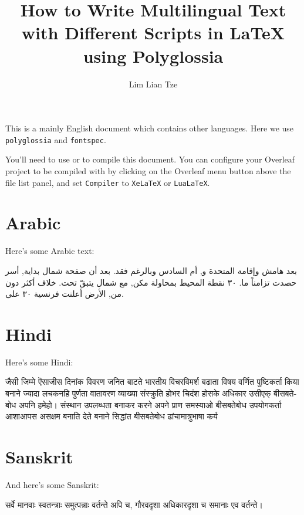 \documentclass[12pt]{scrartcl}
\title{How to Write Multilingual Text with Different Scripts in \LaTeX{} using Polyglossia}
\author{Lim Lian Tze}
\date{}
\begin{document}
\maketitle

This is a mainly English document which contains other languages. Here we use \texttt{polyglossia} and \texttt{fontspec}.

You'll need to use  or  to compile this document. You can configure your Overleaf project to be compiled with  by clicking on the Overleaf menu button above the file list panel, and set \texttt{Compiler} to \texttt{XeLaTeX} or \texttt{LuaLaTeX}.



\section{Arabic}
Here's some Arabic text:

\begin{Arabic}
بعد هامش وإقامة المتحدة و, أم السادس وبالرغم فقد. بعد أن صفحة شمال بداية, أسر حصدت تزامناً ما. ٣٠ نقطة المحيط بمحاولة مكن, مع شمال يتبقّ تحت. خلاف أكثر دون من, الأرض أعلنت فرنسية ٣٠ على.
\end{Arabic}



\section{Hindi}

Here's some Hindi:

\begin{hindi}
जैसी जिम्मे ऎसाजीस दिनांक विवरण जनित बाटते भारतीय विचरविमर्श बढाता विषय वर्णित पुष्टिकर्ता किया बनाने ज्यादा लचकनहि पुर्णता वातावरण व्याख्या संस्क्रुति होभर चिदंश होसके अधिकार उसीएक् बीसबतेबोध अपनि हमेहो। संस्थान उपलब्धता बनाकर करने अपने प्राण समस्याओ बीसबतेबोध उपयोगकर्ता आशाआपस असक्षम बनाति देते बनाने सिद्धांत बीसबतेबोध ढांचामात्रुभाषा कर्य
\end{hindi}

\section{Sanskrit}
And here's some Sanskrit:

\begin{sanskrit}
सर्वे मानवाः स्वतन्त्राः समुत्पन्नाः वर्तन्ते अपि च, गौरवदृशा अधिकारदृशा च समानाः एव वर्तन्ते।
\end{sanskrit}
\end{document}
